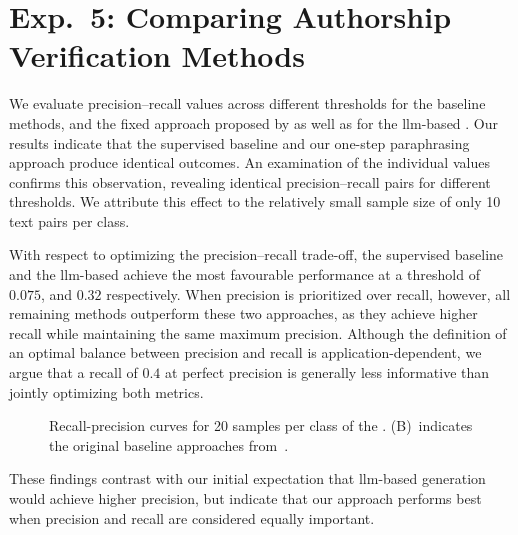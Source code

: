 \section{Exp.\ 5: Comparing Authorship Verification Methods}%
\label{subsec:imp_gen_res}

We evaluate precision–recall values across different thresholds for the baseline methods, and the fixed approach proposed by \citet{koppel_determining_2014} as well as for the \ac{llm}-based \impAppr{}.
Our results indicate that the supervised baseline and our one-step paraphrasing approach produce identical outcomes.
An examination of the individual values confirms this observation, revealing identical precision–recall pairs for different thresholds.
We attribute this effect to the relatively small sample size of only 10 text pairs per class.

With respect to optimizing the precision–recall trade-off, the supervised baseline and the \ac{llm}-based \impAppr{} achieve the most favourable performance at a threshold of $0.075$, and $0.32$ respectively.
When precision is prioritized over recall, however, all remaining methods outperform these two approaches, as they achieve higher recall while maintaining the same maximum precision.
Although the definition of an optimal balance between precision and recall is application-dependent, we argue that a recall of $0.4$ at perfect precision is generally less informative than jointly optimizing both metrics.

\begin{figure}[htbp]
    \centering
    
    \caption[Recall-precision curves for the \dataStudent{}.]{Recall-precision curves for 20 samples per class of the \dataStudent{}. 
    (B)~indicates the original baseline approaches from~\citep{koppel_determining_2014}.
    }
    \label{fig:comp_naive_student}
\end{figure}

These findings contrast with our initial expectation that \ac{llm}-based \imp{} generation would achieve higher precision, but indicate that our approach performs best when precision and recall are considered equally important.
